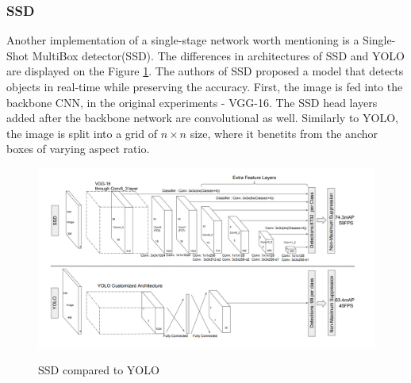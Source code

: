 \documentclass[english, 12pt, a4paper, elec, utf8, a-1b, online]{aaltothesis}
\begin{document}



\subsubsection{SSD}
Another implementation of a single-stage network worth mentioning is a Single-Shot MultiBox detector(SSD)\cite{Liu2015}. The differences in architectures of SSD and YOLO are displayed on the Figure \ref{ssd}. The authors of SSD proposed a model that detects objects in real-time while preserving the accuracy. First, the image is fed into the backbone CNN, in the original experiments - VGG-16. The SSD head layers added after the backbone network are convolutional as well. Similarly to YOLO, the image is split into a grid of $n\times n$ size, where it benetits from the anchor boxes of varying aspect ratio. 


\begin{figure}[htb]
	\begin{center}
		\includegraphics[width=14cm]{./ssd_yolo.png}
	\end{center}
	\caption{SSD compared to YOLO\cite{Liu2015}}
	\begin{center}
		\label{ssd}
	\end{center}
\end{figure}
\FloatBarrier
\end{document}
